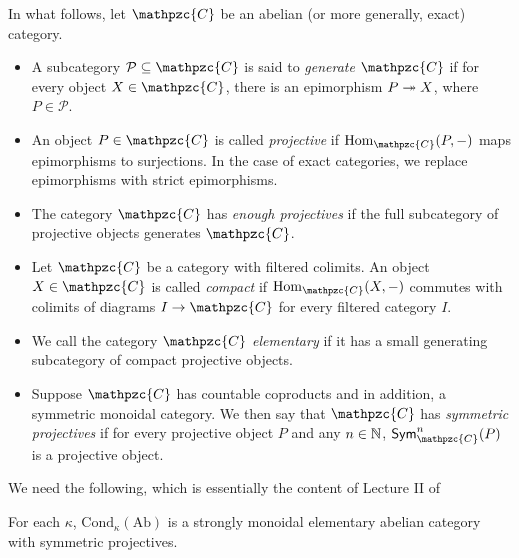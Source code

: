 \begin{definition} In what follows, let \(\mathpzc{C}\) be an abelian (or more generally, exact) category. 
\begin{itemize}
\item A subcategory \(\mathcal{P} \subseteq \mathpzc{C}\) is said to \textit{generate} \(\mathpzc{C}\) if for every object \(X \in \mathpzc{C}\), there is an epimorphism \(P \twoheadrightarrow X\), where \(P \in \mathcal{P}\).
\item An object \(P \in \mathpzc{C}\) is called \textit{projective} if \(\Hom_{\mathpzc{C}}(P,-)\) maps epimorphisms to surjections. In the case of exact categories, we replace epimorphisms with strict epimorphisms.  
\item The category \(\mathpzc{C}\) has \textit{enough projectives} if the full subcategory of projective objects generates \(\mathpzc{C}\). 
\item Let \(\mathpzc{C}\) be a category with filtered colimits. An object \(X \in \mathpzc{C}\) is called \textit{compact} if \(\Hom_{\mathpzc{C}}(X,-)\) commutes with colimits of diagrams \(I \to \mathpzc{C}\) for every filtered category \(I\).  
\item We call the category \(\mathpzc{C}\) \textit{elementary} if it has a small generating subcategory of compact projective objects. 
\item Suppose \(\mathpzc{C}\) has countable coproducts and in addition, a symmetric monoidal category. We then say that \(\mathpzc{C}\) has \textit{symmetric projectives} if for every projective object \(P\) and any \(n \in \mathbb N\), \(\mathsf{Sym}_{\mathpzc{C}}^n(P)\) is a projective object. 
\end{itemize}
\end{definition}



We need the following, which is essentially the content of Lecture II of \cite{clausenscholze1} 

\begin{theorem}
For each $\kappa$, $\mathrm{Cond}_{\kappa}(\mathrm{Ab})$ is a strongly monoidal elementary abelian category with symmetric projectives.
\end{theorem}

